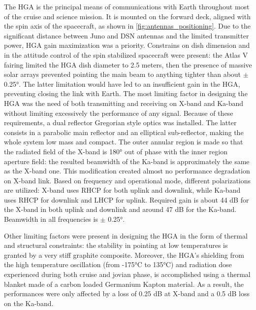 The HGA\cite{juno_telecommunication}\cite{telecommunication_antennas} is the principal means of communications with Earth throughout most of the cruise and science mission. It is mounted on the forward deck, aligned with the spin axis of the spacecraft, as shown in \autoref{fig:antennas_positioning}. Due to the significant distance between Juno and DSN antennas and the limited transmitter power, HGA gain maximization was a priority. Constrains on dish dimension and in the attitude control of the spin stabilized spacecraft were present: the Atlas V fairing limited the HGA dish diameter to 2.5 meters, then the presence of massive solar arrays prevented pointing the main beam to anything tighter than about $\pm$ 0.25°. The latter limitation would have led to an insufficient gain in the HGA, preventing closing the link with Earth. The most limiting factor in designing the HGA was the need of both transmitting and receiving on X-band and Ka-band without limiting  excessively the performance of any signal. Because of these requirements, a dual reflector Gregorian style optics was installed. The latter consists in a parabolic main reflector and an elliptical sub-reflector, making the whole system low mass and compact\cite{telecommunication_antennas}. The outer annular region is made so that the radiated field of the X-band is 180° out of phase with the inner region aperture field: the resulted beamwidth of the Ka-band is approximately the same as the X-band one. This modification created almost no performance degradation on X-band link. Based on frequency and operational mode, different polarizations are utilized: X-band uses RHCP for both uplink and downlink, while Ka-band uses RHCP for downlink and LHCP for uplink\cite{juno_telecommunication}. Required gain is about 44 dB for the X-band in both uplink and downlink and around 47 dB for the Ka-band. Beamwidth in all frequencies is $\pm$ 0.25°.

Other limiting factors were present in designing the HGA in the form of thermal and structural constraints: the stability in pointing at low temperatures is granted by a very stiff graphite composite. Moreover, the HGA's shielding from the high temperature oscillation (from -175°C to 135°C) and radiation dose experienced during both cruise and jovian phase, is accomplished using a thermal blanket made of a carbon loaded Germanium Kapton material\cite{telecommunication_antennas}\cite{germanio}. As a result, the performances were only affected by a loss of 0.25 dB at X-band and a 0.5 dB loss on the Ka-band. 

